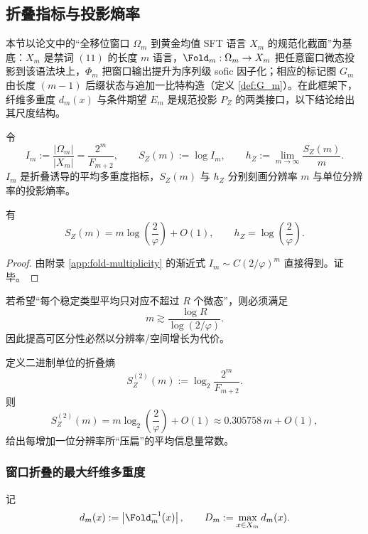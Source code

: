 \subsection{折叠指标与投影熵率}\label{subsec:pom-projection-entropy}
本节以论文中的“全移位窗口 $\Omega_m$ 到黄金均值 SFT 语言 $X_m$ 的规范化截面”为基底：$X_m$ 是禁词 $(11)$ 的长度 $m$ 语言，$\Fold_m:\Omega_m\to X_m$ 把任意窗口微态投影到该语法块上，$\Phi_m$ 把窗口输出提升为序列级 sofic 因子化；相应的标记图 $G_m$ 由长度 $(m-1)$ 后缀状态与追加一比特构造（定义 \ref{def:G_m}）。在此框架下，纤维多重度 $d_m(x)$ 与条件期望 $E_m$ 是规范投影 $P_Z$ 的两类接口，以下结论给出其尺度结构。
\begin{definition}[折叠指标与投影熵率]\label{def:pom-fold-index}
令
\[
I_m:=\frac{|\Omega_m|}{|X_m|}=\frac{2^m}{F_{m+2}},
\qquad
S_Z(m):=\log I_m,
\qquad
h_Z:=\lim_{m\to\infty}\frac{S_Z(m)}{m}.
\]
$I_m$ 是折叠诱导的平均多重度指标，$S_Z(m)$ 与 $h_Z$ 分别刻画分辨率 $m$ 与单位分辨率的投影熵率。
\end{definition}

\begin{proposition}[折叠指标的渐近]\label{prop:pom-projection-entropy}
有
\[
S_Z(m)=m\log\!\left(\frac{2}{\varphi}\right)+O(1),
\qquad
h_Z=\log\!\left(\frac{2}{\varphi}\right).
\]
\end{proposition}
\begin{proof}
由附录 \ref{app:fold-multiplicity} 的渐近式
\(
I_m\sim C(2/\varphi)^m
\)
直接得到。证毕。
\end{proof}

\begin{corollary}[分辨率不足的空间门槛]\label{cor:pom-resolution-threshold}
若希望“每个稳定类型平均只对应不超过 $R$ 个微态”，则必须满足
\[
m\gtrsim \frac{\log R}{\log(2/\varphi)}.
\]
因此提高可区分性必然以分辨率/空间增长为代价。
\end{corollary}

\begin{remark}[折叠熵的二进制斜率]\label{rem:pom-fold-bits}
定义二进制单位的折叠熵
\[
S_Z^{(2)}(m):=\log_2\frac{2^m}{F_{m+2}}.
\]
则
\[
S_Z^{(2)}(m)=m\log_2\!\left(\frac{2}{\varphi}\right)+O(1)
\approx 0.305758\,m+O(1),
\]
给出每增加一位分辨率所“压扁”的平均信息量常数。
\end{remark}

\subsubsection{窗口折叠的最大纤维多重度}\label{subsec:pom-max-fiber}
记
\[
d_m(x):=\left|\Fold_m^{-1}(x)\right|,
\qquad
D_m:=\max_{x\in X_m} d_m(x).
\]
